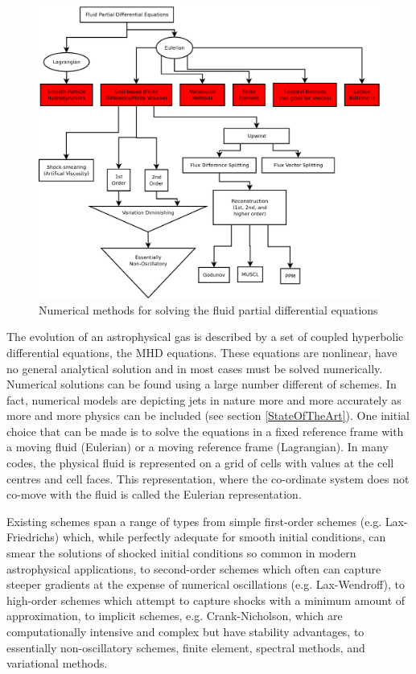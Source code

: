 \begin{figure}[t]
\centering
\includegraphics[width=15cm]{NumericalMethodsforTheFluidEquations}
\caption{ 
Numerical methods for solving the fluid partial differential equations
}
\label{fig:NumMeth} %
\end{figure}

The evolution of an astrophysical gas is described by a set of coupled hyperbolic differential equations, the MHD equations.
These equations are nonlinear, have no general analytical solution and in most cases must be solved numerically.
Numerical solutions can be found using a large number different of schemes.
In fact, numerical models are depicting jets in nature more and more accurately as more and more physics can be included (see section \ref{StateOfTheArt}).
One initial choice that can be made is to solve the equations in a fixed reference frame with a moving fluid (Eulerian) or a moving reference frame (Lagrangian).
In many codes, the physical fluid is represented on a grid of cells with values at the cell centres and cell faces.
This representation, where the co-ordinate system does not co-move with the fluid is called the Eulerian representation.

Existing schemes span a range of types from simple first-order schemes (e.g. Lax-Friedrichs) which,
while perfectly adequate for smooth initial conditions,
can smear the solutions of shocked initial conditions so common in modern astrophysical applications,
to second-order schemes which often can capture steeper gradients at the expense of numerical oscillations (e.g. Lax-Wendroff),
to high-order schemes which attempt to capture shocks with a minimum amount of approximation,
to implicit schemes, e.g. Crank-Nicholson, which are computationally intensive
and complex but have stability advantages,
to essentially non-oscillatory schemes,
finite element,
spectral methods,
and 
variational methods.

